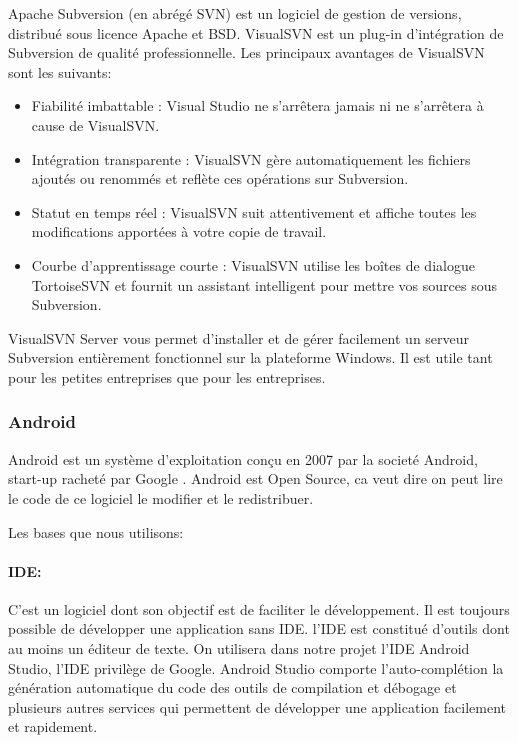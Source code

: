 Apache Subversion (en abrégé SVN) est un logiciel de gestion de versions,
distribué sous licence Apache et BSD.
VisualSVN est un plug-in d’intégration de Subversion de qualité professionnelle.
Les principaux avantages de VisualSVN sont les suivants:

\begin{itemize}
    \item Fiabilité imbattable : Visual Studio ne s’arrêtera jamais ni ne
        s’arrêtera à cause de VisualSVN.
    \item Intégration transparente : VisualSVN gère automatiquement les fichiers
        ajoutés ou renommés et reflète ces opérations sur Subversion.
    \item Statut en temps réel : VisualSVN suit attentivement et affiche toutes
        les modifications apportées à votre copie de travail.
    \item Courbe d’apprentissage courte : VisualSVN utilise les boîtes de
        dialogue TortoiseSVN et fournit un assistant intelligent pour mettre
        vos sources sous Subversion.
\end{itemize}
VisualSVN Server vous permet d’installer et de gérer facilement un serveur
Subversion entièrement fonctionnel sur la plateforme Windows. Il est utile tant
pour les petites entreprises que pour les entreprises.

\subsubsection{Android}
Android est un système d'exploitation conçu en 2007 par la societé Android,
start-up racheté par Google . Android est Open Source, ca veut dire on peut lire
le code de ce logiciel le modifier et le redistribuer.

Les bases que nous utilisons:

\paragraph{IDE:}
C'est un logiciel dont son objectif est de faciliter le développement. Il est
toujours possible de développer une application sans IDE.
l'IDE est constitué d'outils dont au moins un éditeur de texte.
On utilisera dans notre projet l'IDE Android Studio, l'IDE privilège de Google.
Android Studio comporte l'auto-complétion la génération automatique  du code des
outils de compilation et débogage et plusieurs autres services qui permettent de
développer une application facilement et rapidement.

